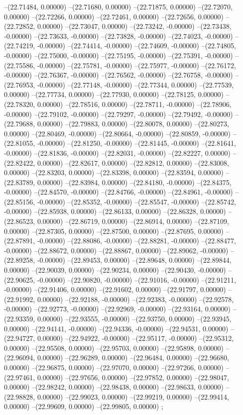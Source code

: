 --(22.71484, 0.00000)
--(22.71680, 0.00000)
--(22.71875, 0.00000)
--(22.72070, 0.00000)
--(22.72266, 0.00000)
--(22.72461, 0.00000)
--(22.72656, 0.00000)
--(22.72852, 0.00000)
--(22.73047, 0.00000)
--(22.73242, -0.00000)
--(22.73438, -0.00000)
--(22.73633, -0.00000)
--(22.73828, -0.00000)
--(22.74023, -0.00000)
--(22.74219, -0.00000)
--(22.74414, -0.00000)
--(22.74609, -0.00000)
--(22.74805, -0.00000)
--(22.75000, -0.00000)
--(22.75195, -0.00000)
--(22.75391, -0.00000)
--(22.75586, -0.00000)
--(22.75781, -0.00000)
--(22.75977, -0.00000)
--(22.76172, -0.00000)
--(22.76367, -0.00000)
--(22.76562, -0.00000)
--(22.76758, -0.00000)
--(22.76953, -0.00000)
--(22.77148, -0.00000)
--(22.77344, 0.00000)
--(22.77539, 0.00000)
--(22.77734, 0.00000)
--(22.77930, 0.00000)
--(22.78125, 0.00000)
--(22.78320, 0.00000)
--(22.78516, 0.00000)
--(22.78711, -0.00000)
--(22.78906, -0.00000)
--(22.79102, -0.00000)
--(22.79297, -0.00000)
--(22.79492, -0.00000)
--(22.79688, 0.00000)
--(22.79883, 0.00000)
--(22.80078, 0.00000)
--(22.80273, 0.00000)
--(22.80469, -0.00000)
--(22.80664, -0.00000)
--(22.80859, -0.00000)
--(22.81055, -0.00000)
--(22.81250, -0.00000)
--(22.81445, -0.00000)
--(22.81641, -0.00000)
--(22.81836, -0.00000)
--(22.82031, -0.00000)
--(22.82227, 0.00000)
--(22.82422, 0.00000)
--(22.82617, 0.00000)
--(22.82812, 0.00000)
--(22.83008, 0.00000)
--(22.83203, 0.00000)
--(22.83398, 0.00000)
--(22.83594, 0.00000)
--(22.83789, 0.00000)
--(22.83984, 0.00000)
--(22.84180, -0.00000)
--(22.84375, -0.00000)
--(22.84570, -0.00000)
--(22.84766, -0.00000)
--(22.84961, -0.00000)
--(22.85156, -0.00000)
--(22.85352, -0.00000)
--(22.85547, -0.00000)
--(22.85742, -0.00000)
--(22.85938, 0.00000)
--(22.86133, 0.00000)
--(22.86328, 0.00000)
--(22.86523, 0.00000)
--(22.86719, 0.00000)
--(22.86914, 0.00000)
--(22.87109, 0.00000)
--(22.87305, 0.00000)
--(22.87500, 0.00000)
--(22.87695, 0.00000)
--(22.87891, -0.00000)
--(22.88086, -0.00000)
--(22.88281, -0.00000)
--(22.88477, -0.00000)
--(22.88672, 0.00000)
--(22.88867, 0.00000)
--(22.89062, -0.00000)
--(22.89258, -0.00000)
--(22.89453, 0.00000)
--(22.89648, 0.00000)
--(22.89844, 0.00000)
--(22.90039, 0.00000)
--(22.90234, 0.00000)
--(22.90430, -0.00000)
--(22.90625, -0.00000)
--(22.90820, -0.00000)
--(22.91016, -0.00000)
--(22.91211, -0.00000)
--(22.91406, 0.00000)
--(22.91602, 0.00000)
--(22.91797, 0.00000)
--(22.91992, 0.00000)
--(22.92188, -0.00000)
--(22.92383, -0.00000)
--(22.92578, -0.00000)
--(22.92773, -0.00000)
--(22.92969, -0.00000)
--(22.93164, 0.00000)
--(22.93359, 0.00000)
--(22.93555, -0.00000)
--(22.93750, 0.00000)
--(22.93945, 0.00000)
--(22.94141, -0.00000)
--(22.94336, -0.00000)
--(22.94531, 0.00000)
--(22.94727, 0.00000)
--(22.94922, -0.00000)
--(22.95117, -0.00000)
--(22.95312, 0.00000)
--(22.95508, 0.00000)
--(22.95703, 0.00000)
--(22.95898, 0.00000)
--(22.96094, 0.00000)
--(22.96289, 0.00000)
--(22.96484, 0.00000)
--(22.96680, 0.00000)
--(22.96875, 0.00000)
--(22.97070, 0.00000)
--(22.97266, 0.00000)
--(22.97461, 0.00000)
--(22.97656, 0.00000)
--(22.97852, 0.00000)
--(22.98047, 0.00000)
--(22.98242, 0.00000)
--(22.98438, 0.00000)
--(22.98633, 0.00000)
--(22.98828, 0.00000)
--(22.99023, 0.00000)
--(22.99219, 0.00000)
--(22.99414, 0.00000)
--(22.99609, 0.00000)
--(22.99805, 0.00000)
;
